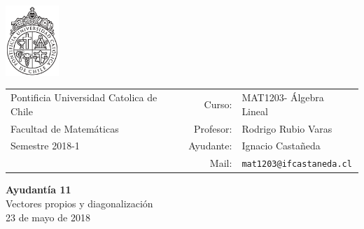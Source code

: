 \documentclass[12pt]{article}
\makeatletter
\newcommand{\ayudantia}{{\sc Ayudantía 11}}
\newcommand{\tituloayu}{Vectores propios y diagonalización}
\newcommand{\fecha}{23 de mayo de 2018}
\newcommand{\sigla}{MAT1203}
\newcommand{\nombre}{Álgebra Lineal}
\newcommand{\profesor}{Rodrigo Rubio Varas}
\newcommand{\ano}{2018}
\newcommand{\semestre}{1}
\newcommand{\mail}{mat1203@ifcastaneda.cl}
\makeatother
\begin{document}
\thispagestyle{empty}

\begin{minipage}{2cm}
	\includegraphics[width=2cm]{../../../../img/logo.pdf}
	\vspace{0.5cm}
\end{minipage}
\begin{minipage}{\linewidth}
	\begin{tabular}{lrl}
		{\scriptsize\sc Pontificia Universidad Catolica de Chile} & \hspace*{0.7in}Curso: &
		\sigla  - \nombre\\
		{\sc Facultad de Matemáticas}&
		Profesor: & \profesor \\
		{\sc Semestre \ano-\semestre} & Ayudante: & {Ignacio Castañeda}\\
		& {Mail:} & \texttt{\mail}
	\end{tabular}
\end{minipage}

\vspace{-10mm}
\begin{center}
	{\LARGE\bf \ayudantia}\\
	\vspace{0.1cm}
	{\tituloayu}\\
	\vspace{0.1cm}
	\fecha\\
	\vspace{0.4cm}
\end{center}
\end{document}

